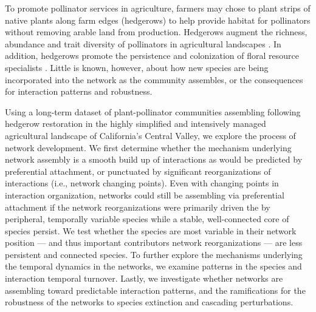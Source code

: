 \documentclass[12pt]{article}
\begin{document}
To promote pollinator services in agriculture, farmers may chose to
plant strips of native plants along farm edges (hedgerows) to help
provide habitat for pollinators without removing arable land from
production. Hedgerows augment the richness, abundance and trait
diversity of pollinators in agricultural landscapes
\citep{morandin-2013-829, mgonigle-2015-x, kremen-2015-602,
  ponisio2015farm}. In addition, hedgerows promote the persistence and
colonization of floral resource specialists
\citep{mgonigle-2015-x}. Little is known, however, about how new
species are being incorporated into the network as the community
assembles, or the consequences for interaction patterns and
robustness.

Using a long-term dataset of plant-pollinator communities assembling
following hedgerow restoration in the highly simplified and
intensively managed agricultural landscape of California's Central
Valley, we explore the process of network development. We first
determine whether the mechanism underlying network assembly is a
smooth build up of interactions as would be predicted by preferential
attachment, or punctuated by significant reorganizations of
interactions (i.e., network changing points). Even with changing
points in interaction organization, networks could still be assembling
via preferential attachment if the network reorganizations were
primarily driven the by peripheral, temporally variable species while
a stable, well-connected core of species persist. We test whether the
species are most variable in their network position --- and thus
important contributors network reorganizations --- are less persistent
and connected species. To further explore the mechanisms underlying
the temporal dynamics in the networks, we examine patterns in the
species and interaction temporal turnover. Lastly, we investigate
whether networks are assembling toward predictable interaction
patterns, and the ramifications for the robustness of the networks to
species extinction and cascading perturbations.

\end{document}
